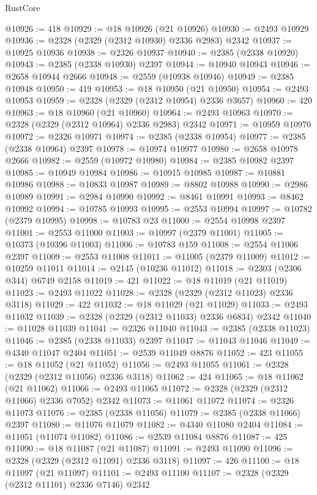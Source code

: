 \begin{lexlean}{RustCore}
\begin{coremodule}
@10926 := 418
@10929 := @18 @10926 (@21 @10926)
@10930 := @2493 @10929
@10936 := @2328 (@2329 (@2312 @10930) @2336 @2983) @2342
@10937 := @10925 @10936
@10938 := @2326 @10937
@10940 := @2385 (@2338 @10920)
@10943 := @2385 (@2338 @10930) @2397
@10944 := @10940 @10943
@10946 := @2658 @10944 @2666
@10948 := @2559 (@10938 @10946)
@10949 := @2385 @10948
@10950 := 419
@10953 := @18 @10950 (@21 @10950)
@10954 := @2493 @10953
@10959 := @2328 (@2329 (@2312 @10954) @2336 @3657)
@10960 := 420
@10963 := @18 @10960 (@21 @10960)
@10964 := @2493 @10963
@10970 := @2328 (@2329 (@2312 @10964) @2336 @2983) @2342
@10971 := @10959 @10970
@10972 := @2326 @10971
@10974 := @2385 (@2338 @10954)
@10977 := @2385 (@2338 @10964) @2397
@10978 := @10974 @10977
@10980 := @2658 @10978 @2666
@10982 := @2559 (@10972 @10980)
@10984 := @2385 @10982 @2397
@10985 := @10949 @10984
@10986 := @10915 @10985
@10987 := @10881 @10986
@10988 := @10833 @10987
@10989 := @8802 @10988
@10990 := @2986 @10989
@10991 := @2984 @10990
@10992 := @8461 @10991
@10993 := @8462 @10992
@10994 := @10785 @10993
@10995 := @2553 @10994
@10997 := @10782 (@2379 @10995)
@10998 := @10783 @23
@11000 := @2554 @10998 @2397
@11001 := @2553 @11000
@11003 := @10997 (@2379 @11001)
@11005 := @10373 (@10396 @11003)
@11006 := @10783 @159
@11008 := @2554 @11006 @2397
@11009 := @2553 @11008
@11011 := @11005 (@2379 @11009)
@11012 := @10259 @11011
@11014 := @2145 (@10236 @11012)
@11018 := @2303 (@2306 @344) @6749 @2158
@11019 := 421
@11022 := @18 @11019 (@21 @11019)
@11023 := @2493 @11022
@11028 := @2328 (@2329 (@2312 @11023) @2336 @3118)
@11029 := 422
@11032 := @18 @11029 (@21 @11029)
@11033 := @2493 @11032
@11039 := @2328 (@2329 (@2312 @11033) @2336 @6834) @2342
@11040 := @11028 @11039
@11041 := @2326 @11040
@11043 := @2385 (@2338 @11023)
@11046 := @2385 (@2338 @11033) @2397
@11047 := @11043 @11046
@11049 := @4340 @11047 @2404
@11051 := @2539 @11049 @8876
@11052 := 423
@11055 := @18 @11052 (@21 @11052)
@11056 := @2493 @11055
@11061 := @2328 (@2329 (@2312 @11056) @2336 @3118)
@11062 := 424
@11065 := @18 @11062 (@21 @11062)
@11066 := @2493 @11065
@11072 := @2328 (@2329 (@2312 @11066) @2336 @7052) @2342
@11073 := @11061 @11072
@11074 := @2326 @11073
@11076 := @2385 (@2338 @11056)
@11079 := @2385 (@2338 @11066) @2397
@11080 := @11076 @11079
@11082 := @4340 @11080 @2404
@11084 := @11051 (@11074 @11082)
@11086 := @2539 @11084 @8876
@11087 := 425
@11090 := @18 @11087 (@21 @11087)
@11091 := @2493 @11090
@11096 := @2328 (@2329 (@2312 @11091) @2336 @3118)
@11097 := 426
@11100 := @18 @11097 (@21 @11097)
@11101 := @2493 @11100
@11107 := @2328 (@2329 (@2312 @11101) @2336 @7146) @2342

\end{coremodule}
\end{lexlean}
